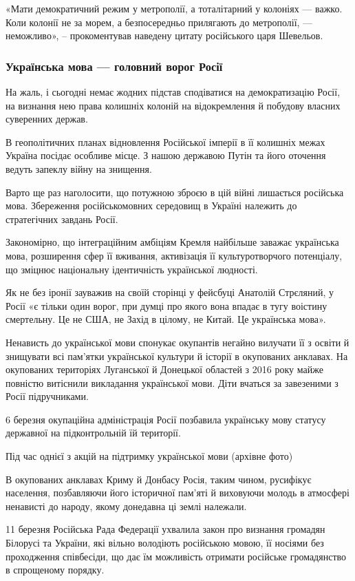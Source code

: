 «Мати демократичний режим у метрополії, а тоталітарний у колоніях --- важко. Коли
колонії не за морем, а безпосередньо прилягають до метрополії, --- неможливо», –
прокоментував наведену цитату російського царя Шевельов.

\subsubsection{Українська мова --- головний ворог Росії}

На жаль, і сьогодні немає жодних підстав сподіватися на демократизацію Росії,
на визнання нею права колишніх колоній на відокремлення й побудову власних
суверенних держав.

В геополітичних планах відновлення Російської імперії в її колишніх межах
Україна посідає особливе місце. З нашою державою Путін та його оточення ведуть
запеклу війну на знищення.

Варто ще раз наголосити, що потужною зброєю в цій війні лишається російська
мова. Збереження російськомовних середовищ в Україні належить до стратегічних
завдань Росії.

Закономірно, що інтеграційним амбіціям Кремля найбільше заважає українська
мова, розширення сфер її вживання, активізація її культуротворчого потенціалу,
що зміцнює національну ідентичність української людності.

Як не без іронії зауважив на своїй сторінці у фейсбуці Анатолій Стрєляний, у
Росії «є тільки один ворог, при думці про якого вона впадає в тугу воістину
смертельну. Це не США, не Захід в цілому, не Китай. Це українська мова».

Ненависть до української мови спонукає окупантів негайно вилучати її з освіти й
знищувати всі пам’ятки української культури й історії в окупованих анклавах. На
окупованих територіях Луганської й Донецької областей з 2016 року майже
повністю витіснили викладання української мови. Діти вчаться за завезеними з
Росії підручниками.

6 березня окупаційна адміністрація Росії позбавила українську мову статусу
державної на підконтрольній їй території.

Під час однієї з акцій на підтримку української мови (архівне фото)

В окупованих анклавах Криму й Донбасу Росія, таким чином, русифікує населення,
позбавляючи його історичної пам’яті й виховуючи молодь в атмосфері ненависті до
народу, якому донедавна ці землі належали.

11 березня Російська Рада Федерації ухвалила закон про визнання громадян
Білорусі та України, які вільно володіють російською мовою, її носіями без
проходження співбесіди, що дає їм можливість отримати російське громадянство в
спрощеному порядку.

